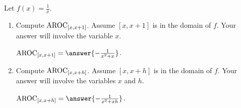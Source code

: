 \documentclass{ximera}
\author{Kenneth Berglund}
\begin{document}
\licenseSZ
\begin{exercise}

Let $f(x) = \frac{1}{x}$.

\begin{enumerate}
\item Compute $\mathrm{AROC}_{[x, x+1]}$. Assume $[x, x + 1]$ is in the domain of $f$. Your answer will involve the variable $x$.

$\av_{[x, x + 1]} = \answer{-\frac{1}{x^2 + x}}$.

\item Compute $\mathrm{AROC}_{[x, x+h]}$. Assume $[x, x + h]$ is in the domain of $f$. Your answer will involve the variables $x$ and $h$.

$\av_{[x, x + h]} = \answer{-\frac{1}{x^2 + xh}}$.

	
\end{enumerate}

\end{exercise}
\end{document}
